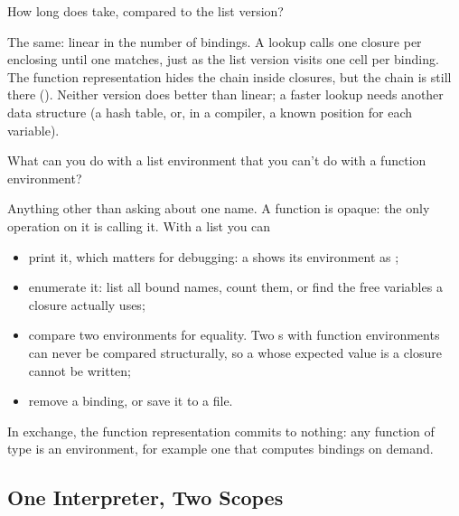 \begin{exercise}
How long does  take, compared to the list version?
\end{exercise}
\begin{solution}
The same: linear in the number of bindings. A lookup calls one closure per enclosing  until one matches, just as the list version visits one  cell per binding. The function representation hides the chain inside closures, but the chain is still there (). Neither version does better than linear; a faster lookup needs another data structure (a hash table, or, in a compiler, a known position for each variable).
\end{solution}

\begin{exercise}
What can you do with a list environment that you can't do with a function environment?
\end{exercise}
\begin{solution}
Anything other than asking about one name. A function is opaque: the only operation on it is calling it. With a list you can
\begin{itemize}
  \item print it, which matters for debugging: a  shows its environment as ;
  \item enumerate it: list all bound names, count them, or find the free variables a closure actually uses;
  \item compare two environments for equality. Two s with function environments can never be compared structurally, so a  whose expected value is a closure cannot be written;
  \item remove a binding, or save it to a file.
\end{itemize}
In exchange, the function representation commits to nothing: any function of type  is an environment, for example one that computes bindings on demand.
\end{solution}

\subsection{One Interpreter, Two Scopes}

